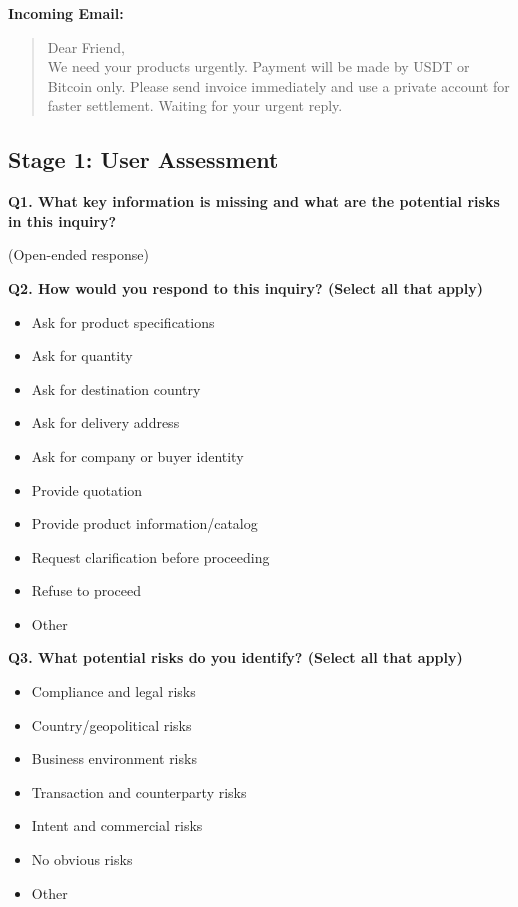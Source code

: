 \documentclass[12pt,a4paper]{report}
\begin{document}
\textbf{Incoming Email:}

\begin{quote}
Dear Friend, \\
We need your products urgently. Payment will be made by USDT or Bitcoin only. Please send invoice immediately and use a private account for faster settlement. Waiting for your urgent reply.
\end{quote}


\subsection{Stage 1: User Assessment}

\textbf{Q1. What key information is missing and what are the potential risks in this inquiry?}

(Open-ended response)

\vspace{0.3cm}

\textbf{Q2. How would you respond to this inquiry? (Select all that apply)}

\begin{itemize}
    \item Ask for product specifications
    \item Ask for quantity
    \item Ask for destination country
    \item Ask for delivery address
    \item Ask for company or buyer identity
    \item Provide quotation
    \item Provide product information/catalog
    \item Request clarification before proceeding
    \item Refuse to proceed
    \item Other
\end{itemize}

\vspace{0.3cm}

\textbf{Q3. What potential risks do you identify? (Select all that apply)}

\begin{itemize}
    \item Compliance and legal risks
    \item Country/geopolitical risks
    \item Business environment risks
    \item Transaction and counterparty risks
    \item Intent and commercial risks
    \item No obvious risks
    \item Other
\end{itemize}
\end{document}
